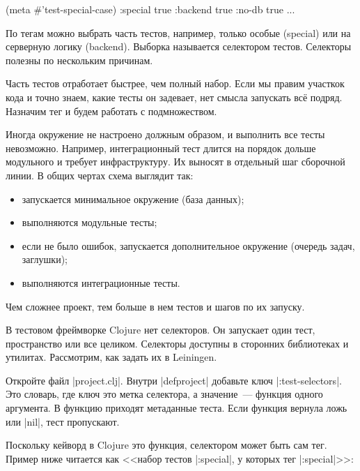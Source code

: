 \begin{english}
  \begin{clojure}
(meta #'test-special-case)
{:special true :backend true :no-db true ...}
  \end{clojure}
\end{english}

По тегам можно выбрать часть тестов, например, только особые (special) или на
серверную логику (backend). Выборка называется селектором тестов. Селекторы
полезны по нескольким причинам.

Часть тестов отработает быстрее, чем полный набор. Если мы правим участкок кода
и точно знаем, какие тесты он задевает, нет смысла запускать вс\"{е}
подряд. Назначим тег и будем работать с подмножеством.

Иногда окружение не настроено должным образом, и выполнить все тесты
невозможно. Например, интеграционный тест длится на порядок дольше модульного и
требует инфраструктуру. Их выносят в отдельный шаг сборочной линии. В общих
чертах схема выглядит так:

\begin{itemize}

\item
  запускается минимальное окружение (база данных);

\item
  выполняются модульные тесты;

\item
  если не было ошибок, запускается дополнительное окружение (очередь задач, заглушки);

\item
  выполняются интеграционные тесты.

\end{itemize}

Чем сложнее проект, тем больше в нем тестов и шагов по их запуску.

В тестовом фреймворке Clojure нет селекторов. Он запускает один тест,
пространство или все целиком. Селекторы доступны в сторонних библиотеках и
утилитах. Рассмотрим, как задать их в Leiningen.

Откройте файл \spverb|project.clj|. Внутри \spverb|defproject| добавьте ключ
\spverb|:test-selectors|. Это словарь, где ключ это метка селектора, а
значение~--- функция одного аргумента. В функцию приходят метаданные теста. Если
функция вернула ложь или \spverb|nil|, тест пропускают.

Поскольку кейворд в Clojure это функция, селектором может быть сам тег. Пример
ниже читается как <<набор тестов \spverb|:special|, у которых тег \spverb|:special|>>:

